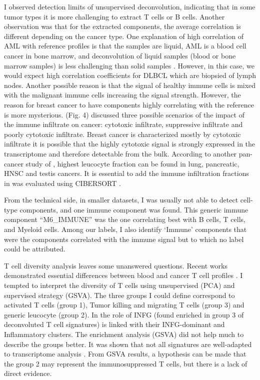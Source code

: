 \documentclass[12pt,]{book}
\theoremstyle{definition}
\theoremstyle{definition}
\theoremstyle{definition}
\theoremstyle{remark}
\begin{document}
I observed detection limits of unsupervised deconvolution, indicating
that in some tumor types it is more challenging to extract T cells or B
cells. Another observation was that for the extracted components, the
average correlation is different depending on the cancer type. One
explanation of high correlation of AML with reference profiles is that
the samples are liquid, AML is a blood cell cancer in bone marrow, and
deconvolution of liquid samples (blood or bone marrow samples) is less
challenging than solid samples \citet{Racle2017}. However, in this case,
we would expect high correlation coefficients for DLBCL which are
biopsied of lymph nodes. Another possible reason is that the signal of
healthy immune cells is mixed with the malignant immune cells increasing
the signal strength. However, the reason for breast cancer to have
components highly correlating with the reference is more mysterious.
\citet{Tamborero2018} (Fig. 4) discussed three possible scenarios of the
impact of the immune infiltrate on cancer: cytotoxic infiltrate,
suppressive infiltrate and poorly cytotoxic infiltrate. Breast cancer is
characterized mostly by cytotoxic infiltrate it is possible that the
highly cytotoxic signal is strongly expressed in the transcriptome and
therefore detectable from the bulk. According to another pan-cancer
study of \citet{Thorsson2018}, highest leucocyte fraction can be found
in lung, pancreatic, HNSC and testis cancers. It is essential to add the
immune infiltration fractions in \citep{Thorsson2018} was evaluated
using CIBERSORT \citep{Newman2015}.

From the technical side, in smaller datasets, I was usually not able to
detect cell-type components, and one immune component was found. This
generic immune component ``M6\_IMMUNE'' was the one correlating best
with B cells, T cells, and Myeloid cells. Among our labels, I also
identify `Immune' components that were the components correlated with
the immune signal but to which no label could be attributed.

T cell diversity analysis leaves some unanswered questions. Recent works
demonstrated essential differences between blood and cancer T cell
profiles \citep{Schelker2017, Tirosh2016}. I tempted to interpret the
diversity of T cells using unsupervised (PCA) and supervised strategy
(GSVA). The three groups I could define correspond to activated T cells
(group 1), Tumor killing and migrating T cells (group 3) and generic
leucocyte (group 2). In \citep{Thorsson2018} the role of INFG (found
enriched in group 3 of deconvoluted T cell signatures) is linked with
their INFG-dominant and Inflammatory clusters. The enrichment analysis
(GSVA) did not help much to describe the groups better. It was shown
that not all signatures are well-adapted to transcriptome analysis
\citep{Cantini2018b}. From GSVA results, a hypothesis can be made that
the group 2 may represent the immunosuppressed T cells, but there is a
lack of direct evidence.
\end{document}
